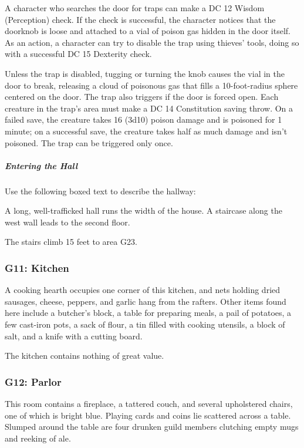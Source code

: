 \documentclass[10pt,a4paper,twoside,bg=print,twocolumn,openany,nodeprecatedcode]{dndbook}
\begin{document}
A character who searches the door for traps can make a DC 12 Wisdom (Perception) check. If the check is successful, the character notices that the doorknob is loose and attached to a vial of poison gas hidden in the door itself. As an action, a character can try to disable the trap using thieves' tools, doing so with a successful DC 15 Dexterity check.

Unless the trap is disabled, tugging or turning the knob causes the vial in the door to break, releasing a cloud of poisonous gas that fills a 10-foot-radius sphere centered on the door. The trap also triggers if the door is forced open. Each creature in the trap's area must make a DC 14 Constitution saving throw. On a failed save, the creature takes 16 (3d10) poison damage and is poisoned for 1 minute; on a successful save, the creature takes half as much damage and isn't poisoned. The trap can be triggered only once.

\subparagraph{Entering the Hall}
Use the following boxed text to describe the hallway:

\begin{DndReadAloud}{}
A long, well-trafficked hall runs the width of the house. A staircase along the west wall leads to the second floor.

\end{DndReadAloud}

The stairs climb 15 feet to area G23.

\subsubsection{G11: Kitchen}
\begin{DndReadAloud}{}
A cooking hearth occupies one corner of this kitchen, and nets holding dried sausages, cheese, peppers, and garlic hang from the rafters. Other items found here include a butcher's block, a table for preparing meals, a pail of potatoes, a few cast-iron pots, a sack of flour, a tin filled with cooking utensils, a block of salt, and a knife with a cutting board.

\end{DndReadAloud}

The kitchen contains nothing of great value.

\subsubsection{G12: Parlor}
\begin{DndReadAloud}{}
This room contains a fireplace, a tattered couch, and several upholstered chairs, one of which is bright blue. Playing cards and coins lie scattered across a table. Slumped around the table are four drunken guild members clutching empty mugs and reeking of ale.

\end{DndReadAloud}
\end{document}
